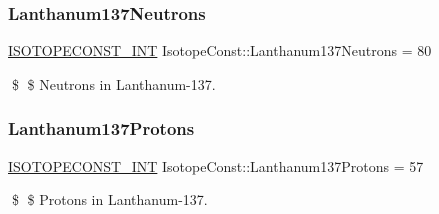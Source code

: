 \subsubsection{\texorpdfstring{Lanthanum137\+Neutrons}{Lanthanum137Neutrons}}
{\footnotesize\ttfamily \mbox{\hyperlink{group___isotope_const-_macros_ga5f18360b3e99483a35c32d789e62621c}{I\+S\+O\+T\+O\+P\+E\+C\+O\+N\+S\+T\+\_\+\+I\+NT}} Isotope\+Const\+::\+Lanthanum137\+Neutrons = 80}

\$ \$ Neutrons in Lanthanum-\/137. \mbox{\label{group___isotope_const-_lanthanum-_la137_ga6617aea23e8ec81c5863be6567709081}} 
\subsubsection{\texorpdfstring{Lanthanum137\+Protons}{Lanthanum137Protons}}
{\footnotesize\ttfamily \mbox{\hyperlink{group___isotope_const-_macros_ga5f18360b3e99483a35c32d789e62621c}{I\+S\+O\+T\+O\+P\+E\+C\+O\+N\+S\+T\+\_\+\+I\+NT}} Isotope\+Const\+::\+Lanthanum137\+Protons = 57}

\$ \$ Protons in Lanthanum-\/137. 